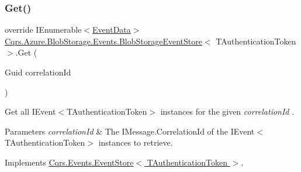 \subsubsection{\texorpdfstring{Get()}{Get()}\hspace{0.1cm}{\footnotesize\ttfamily [2/2]}}
{\footnotesize\ttfamily override I\+Enumerable$<$\hyperlink{classCqrs_1_1Events_1_1EventData}{Event\+Data}$>$ \hyperlink{classCqrs_1_1Azure_1_1BlobStorage_1_1Events_1_1BlobStorageEventStore}{Cqrs.\+Azure.\+Blob\+Storage.\+Events.\+Blob\+Storage\+Event\+Store}$<$ T\+Authentication\+Token $>$.Get (\begin{DoxyParamCaption}\item[{Guid}]{correlation\+Id }\end{DoxyParamCaption})\hspace{0.3cm}{\ttfamily [virtual]}}



Get all I\+Event$<$\+T\+Authentication\+Token$>$ instances for the given {\itshape correlation\+Id} . 


\begin{DoxyParams}{Parameters}
{\em correlation\+Id} & The I\+Message.\+Correlation\+Id of the I\+Event$<$\+T\+Authentication\+Token$>$ instances to retrieve.\\
\hline
\end{DoxyParams}


Implements \hyperlink{classCqrs_1_1Events_1_1EventStore_a0096646f5dff730b0041b9469719c420_a0096646f5dff730b0041b9469719c420}{Cqrs.\+Events.\+Event\+Store$<$ T\+Authentication\+Token $>$}.

\mbox{\label{classCqrs_1_1Azure_1_1BlobStorage_1_1Events_1_1BlobStorageEventStore_a3c2ec49781bbcf7e0c2549133c160591_a3c2ec49781bbcf7e0c2549133c160591}} 
